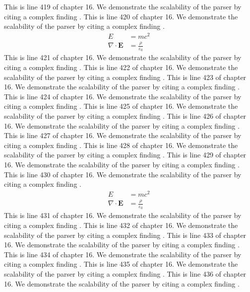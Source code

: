 This is line 419 of chapter 16. We demonstrate the scalability of the parser by citing a complex finding \cite{ref16_419}.
This is line 420 of chapter 16. We demonstrate the scalability of the parser by citing a complex finding \cite{ref16_420}.
\begin{align*}
  E &= mc^2 \\
  \nabla \cdot \mathbf{E} &= \frac{\rho}{\varepsilon_0}
\end{align*}
This is line 421 of chapter 16. We demonstrate the scalability of the parser by citing a complex finding \cite{ref16_421}.
This is line 422 of chapter 16. We demonstrate the scalability of the parser by citing a complex finding \cite{ref16_422}.
This is line 423 of chapter 16. We demonstrate the scalability of the parser by citing a complex finding \cite{ref16_423}.
This is line 424 of chapter 16. We demonstrate the scalability of the parser by citing a complex finding \cite{ref16_424}.
This is line 425 of chapter 16. We demonstrate the scalability of the parser by citing a complex finding \cite{ref16_425}.
This is line 426 of chapter 16. We demonstrate the scalability of the parser by citing a complex finding \cite{ref16_426}.
This is line 427 of chapter 16. We demonstrate the scalability of the parser by citing a complex finding \cite{ref16_427}.
This is line 428 of chapter 16. We demonstrate the scalability of the parser by citing a complex finding \cite{ref16_428}.
This is line 429 of chapter 16. We demonstrate the scalability of the parser by citing a complex finding \cite{ref16_429}.
This is line 430 of chapter 16. We demonstrate the scalability of the parser by citing a complex finding \cite{ref16_430}.
\begin{align*}
  E &= mc^2 \\
  \nabla \cdot \mathbf{E} &= \frac{\rho}{\varepsilon_0}
\end{align*}
This is line 431 of chapter 16. We demonstrate the scalability of the parser by citing a complex finding \cite{ref16_431}.
This is line 432 of chapter 16. We demonstrate the scalability of the parser by citing a complex finding \cite{ref16_432}.
This is line 433 of chapter 16. We demonstrate the scalability of the parser by citing a complex finding \cite{ref16_433}.
This is line 434 of chapter 16. We demonstrate the scalability of the parser by citing a complex finding \cite{ref16_434}.
This is line 435 of chapter 16. We demonstrate the scalability of the parser by citing a complex finding \cite{ref16_435}.
This is line 436 of chapter 16. We demonstrate the scalability of the parser by citing a complex finding \cite{ref16_436}.
